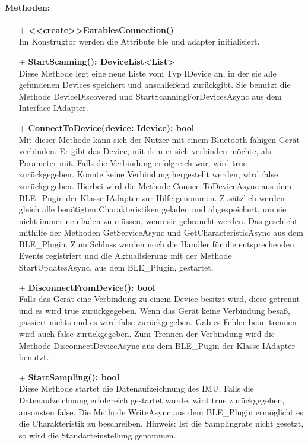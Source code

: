 \documentclass[a4paper,12pt]{article}
\begin{document}
\paragraph{Methoden:}
\begin{itemize}
	\item[+] \textbf{<<create>>\Gls{Earables}Connection()}\\ Im Konstruktor werden die Attribute ble und adapter initialisiert.
	\item[+] \textbf{StartScanning(): DeviceList<List>}\\ Diese Methode legt eine neue Liste vom Typ IDevice an, in der sie alle gefundenen Devices speichert und anschließend zurückgibt. Sie benutzt die Methode DeviceDiscovered und StartScanningForDevicesAsync aus dem Interface IAdapter.
	\item[+] \textbf{ConnectToDevice(device: Idevice): bool}\\ Mit dieser Methode kann sich der Nutzer mit einem Bluetooth fähigen Gerät verbinden. Er gibt das Device, mit dem er sich verbinden möchte, als Parameter mit. Falls die Verbindung erfolgreich war, wird true zurückgegeben. Konnte keine Verbindung hergestellt werden, wird false zurückgegeben. Hierbei wird die Methode ConnectToDeviceAsync aus dem BLE\_Pugin der Klasse IAdapter zur Hilfe genommen. Zusätzlich werden gleich alle benötigten Charakteristiken geladen und abgespeichert, um sie nicht immer neu laden zu müssen, wenn sie gebraucht werden. Das geschieht mithilfe der Methoden GetServiceAsync und GetCharacteristicAsync aus dem BLE\_Plugin. Zum Schluss werden noch die Handler für die entsprechenden Events registriert und die Aktualisierung mit der Methode StartUpdatesAsync, aus dem BLE\_Plugin, gestartet.
	\item[+] \textbf{DisconnectFromDevice(): bool}\\ Falls das Gerät eine Verbindung zu einem Device besitzt wird, diese getrennt und es wird true zurückgegeben. Wenn das Gerät keine Verbindung besaß, passiert nichts und es wird false zurückgegeben. Gab es Fehler beim trennen wird auch false zurückgegeben. Zum Trennen der Verbindung wird die Methode DisconnectDeviceAsync aus dem BLE\_Pugin der Klasse IAdapter benutzt.
	\item[+] \textbf{StartSampling(): bool}\\ Diese Methode startet die Datenaufzeichnung des IMU. Falls die Datenaufzeichnung erfolgreich gestartet wurde, wird true zurückgegeben, ansonsten false. Die Methode WriteAsync aus dem BLE\_Plugin ermöglicht es die Charakteristik zu beschreiben. Hinweis: Ist die Samplingrate nicht gesetzt, so wird die Standarteinstellung genommen.

\end{itemize}
\end{document}
